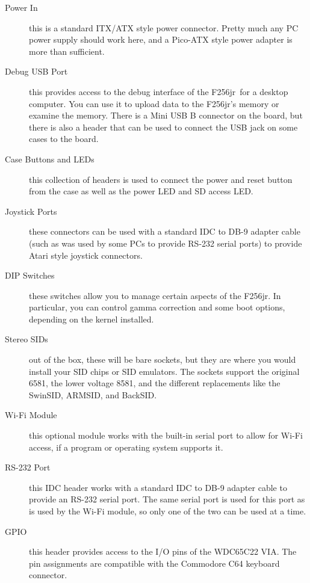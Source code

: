\documentclass[oneside]{book}
\newcommand{\jr}{F256jr}
\begin{document}
\begin{description}
    \item[Power In] this is a standard ITX/ATX style power connector. Pretty much any PC power supply should work here, and a Pico-ATX style power adapter is more than sufficient.

    \item[Debug USB Port] this provides access to the debug interface of the \jr\ for a desktop computer. You can use it to upload data to the \jr's memory or examine the memory. There is a Mini USB B connector on the board, but there is also a header that can be used to connect the USB jack on some cases to the board.

    \item[Case Buttons and LEDs] this collection of headers is used to connect the power and reset button from the case as well as the power LED and SD access LED.

    \item[Joystick Ports] these connectors can be used with a standard IDC to DB-9 adapter cable (such as was used by some PCs to provide RS-232 serial ports) to provide Atari style joystick connectors.

    \item[DIP Switches] these switches allow you to manage certain aspects of the \jr. In particular, you can control gamma correction and some boot options, depending on the kernel installed.

    \item[Stereo SIDs] out of the box, these will be bare sockets, but they are where you would install your SID chips or SID emulators. The sockets support the original 6581, the lower voltage 8581, and the different replacements like the SwinSID, ARMSID, and BackSID.

    \item[Wi-Fi Module] this optional module works with the built-in serial port to allow for Wi-Fi access, if a program or operating system supports it.

    \item[RS-232 Port] this IDC header works with a standard IDC to DB-9 adapter cable to provide an RS-232 serial port. The same serial port is used for this port as is used by the Wi-Fi module, so only one of the two can be used at a time.

    \item[GPIO] this header provides access to the I/O pins of the WDC65C22 VIA. The pin assignments are compatible with the Commodore C64 keyboard connector.


\end{description}
\end{document}
